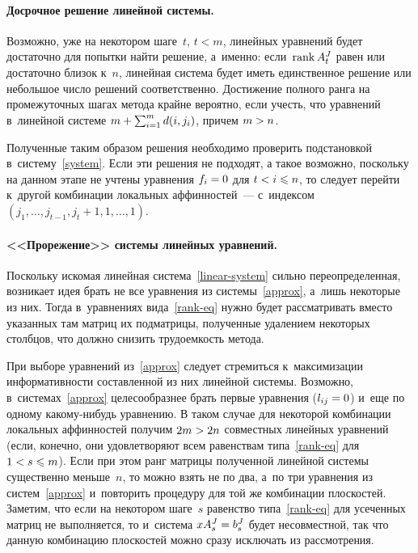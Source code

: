 \begin{multicols}{2}
\vspace*{-12pt}

\paragraph*{Досрочное решение линейной системы.}
Возможно, уже на некотором шаге~$t$, $t<m$, линейных уравнений будет достаточно 
для попытки найти решение, а~именно: если~$\mathrm{rank}\, A^{J}_t$ равен или достаточно 
близок к~$n$, линейная система будет иметь единственное решение или небольшое 
число решений соответственно.
Достижение полного ранга на промежуточных шагах метода крайне вероятно, если 
учесть, что уравнений в~линейной системе $m\hm+\sum\nolimits_{i=1}^m d(i,j_i)$, причем 
$m\hm>n$.

Полученные таким образом решения необходимо проверить подстановкой 
в~систему~\eqref{system}. Если эти решения не подходят, а такое возможно, 
поскольку на данном этапе не учтены уравнения $f_i\hm=0$ для $t\hm<i\hm\leqslant n$, то 
следует перейти к~другой комбинации локальных аффинностей~--- с~индексом 
$(j_1,\ldots,j_{t-1},j_t+1,1,\ldots,1)$.

\vspace*{-12pt}

\paragraph*{<<Прорежение>> системы линейных уравнений.}
Поскольку искомая линейная система~\eqref{linear-system} сильно 
переопределенная, возникает идея брать не все уравнения из 
системы~\eqref{approx}, а~лишь некоторые из них.
Тогда в~уравнениях вида~\eqref{rank-eq} нужно будет рас\-смат\-ри\-вать вместо 
указанных там мат\-риц их под\-мат\-ри\-цы, полученные удалением некоторых столбцов, что 
должно снизить трудоемкость метода.


При выборе уравнений из~\eqref{approx} следует стремиться к~максимизации 
информативности составленной из них линейной системы.
Возможно, в~системах~\eqref{approx} целесообразнее брать первые уравнения 
($l_{ij}\hm=0$) и~еще по одному ка\-ко\-му-ни\-будь уравнению.
В таком случае для некоторой комбинации локальных аффинностей получим $2m\hm>2n$ 
совместных линейных уравнений (если, конечно, они удовлетворяют всем равенствам 
типа~\eqref{rank-eq} для $1\hm<s\hm\leqslant m$).
Если при этом ранг матрицы полученной линейной системы существенно меньше~$n$, 
то можно взять не по два, а~по три уравнения из систем~\eqref{approx} 
и~повторить процедуру для той же комбинации плоскостей.
Заметим, что если на некотором шаге~$s$ равенство типа~\eqref{rank-eq} для 
усеченных матриц не выполняется, то и~система $xA^{J}_s\hm=b^{J}_s$ будет 
несовместной, так что данную комбинацию плоскостей можно сразу исключать из 
рассмотрения.


\end{multicols}
